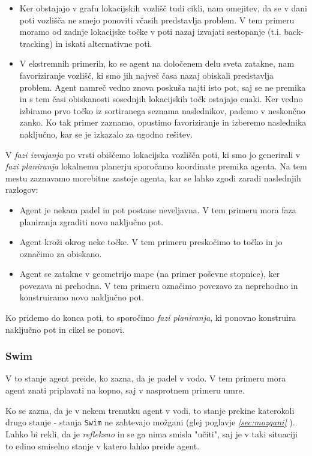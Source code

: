 \documentclass[a4paper,10pt]{article}
\begin{document}
\begin{itemize}
 \item Ker obstajajo v grafu lokacijskih vozlišč tudi cikli, nam omejitev, da se v dani poti vozlišča ne smejo ponoviti včasih predstavlja problem. V tem primeru moramo od zadnje lokacijske točke v poti nazaj izvajati sestopanje (t.i. back-tracking) in iskati alternativne poti.
 
 \item V ekstremnih primerih, ko se agent na določenem delu sveta zatakne, nam favoriziranje vozlišč, ki smo jih največ časa nazaj obiskali predstavlja problem. Agent namreč vedno znova poskuša najti isto pot, saj se ne premika in s tem časi obiskanosti sosednjih lokacijskih točk ostajajo enaki. Ker vedno izbiramo prvo točko iz sortiranega seznama naslednikov, pademo v neskončno zanko. Ko tak primer zaznamo, opustimo favoriziranje in izberemo naslednika naključno, kar se je izkazalo za ugodno rešitev.
\end{itemize}

V \textit{fazi izvajanja} po vrsti obiščemo lokacijska vozlišča poti, ki smo jo generirali v \textit{fazi planiranja} lokalnemu planerju sporočamo koordinate premika agenta. Na tem mestu zaznavamo morebitne zastoje agenta, kar se lahko zgodi zaradi naslednjih razlogov:
\begin{itemize}
 \item Agent je nekam padel in pot postane neveljavna. V tem primeru mora faza planiranja zgraditi novo naključno pot.
 \item Agent kroži okrog neke točke. V tem primeru preskočimo to točko in jo označimo za obiskano.
 \item Agent se zatakne v geometrijo mape (na primer poševne stopnice), ker povezava ni prehodna. V tem primeru označimo povezavo za neprehodno in konstruiramo novo naključno pot.
\end{itemize}

Ko pridemo do konca poti, to sporočimo \textit{fazi planiranja}, ki ponovno konstruira naključno pot in cikel se ponovi. 
  
\subsubsection{Swim}
V to stanje agent preide, ko zazna, da je padel v vodo. V tem primeru mora agent znati priplavati na kopno, saj v nasprotnem primeru umre.

Ko se zazna, da je v nekem trenutku agent v vodi, to stanje prekine katerokoli drugo stanje - stanja \verb+Swim+ ne zahtevajo možgani (glej poglavje \textit{\ref{sec:mozgani} }). Lahko bi rekli, da je \textit{refleksno} in se ga nima smisla "učiti", saj je v taki situaciji to edino smiselno stanje v katero lahko preide agent.
\end{document}
